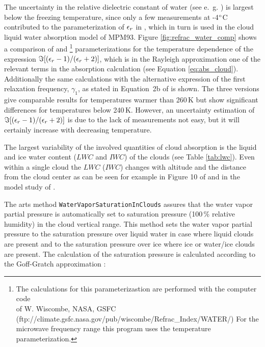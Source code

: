 The uncertainty in the relative dielectric constant of water 
(see e.~g. \citet{liptonetal:99}) is largest below the freezing 
temperature, since only a few measurements at -4$^{\rm o}$C 
contributed to the parameterization of $\epsilon_r$ in \cite{liebeetal:91}, 
which in turn is used in the cloud liquid water absorption model of MPM93. 
Figure \ref{fig:refrac_water_comp} shows a comparison of 
\cite{liebeetal:91} and \cite{ray:72}\footnote{{The calculations
  for this parameterizastion are performed with the computer code}\\{
   of W. Wiscombe, NASA, GSFC}\\
  (ftp://climate.gsfc.nasa.gov/pub/wiscombe/Refrac\_Index/WATER/)
  For the microwave frequency range this program uses the
  \cite{ray:72} temperature parameterization.} parameterizations 
for the temperature dependence of the expression
$\Im{[(\epsilon_r-1)/(\epsilon_r+2)]}$, which is in the Rayleigh approximation 
one of the relevant terms in the absorption calculation (see 
Equation \ref{eq:abs_cloud}). Additionally the same calculations with 
the alternative expression of the first  relaxation frequency, 
$\gamma_1$, as stated in Equation~2b of \cite{liebeetal:91} is shown. 
The three versions give comparable results for temperatures warmer 
than 260\,K but show significant  differences for temperatures below 
240\,K. However, an uncertainty estimation of $\Im{[(\epsilon_r-1)/(\epsilon_r+2)]}$ 
is due to the lack of measurements not easy, but it will certainly
increase with decreasing temperature.

The largest variability of the involved quantities of cloud absorption
is the liquid and ice water content ($LWC$ and $IWC$) of the clouds 
(see Table \ref{tab:lwc}). Even within a single cloud the $LWC$ ($IWC$) changes
with altitude and the distance from the cloud center as can be seen for
example in Figure 10 of \citet{ludlammason:57} and in the model study
of \citet{costaetal:00}.




\label{levelb:WV_sat_in_cloud}

The arts method {\tt WaterVaporSaturationInClouds{}} assures that 
the water vapor partial pressure is automatically set to 
saturation pressure (100\,\% relative humidity) in the cloud vertical
range.
This method sets the water vapor partial pressure to the 
saturation pressure over liquid water in case where liquid clouds 
are present and to the saturation pressure over ice where 
ice or water/ice clouds are present. The calculation of the 
saturation pressure is calculated according to the 
Goff-Gratch approximation \citep{liebeetal:93}:

